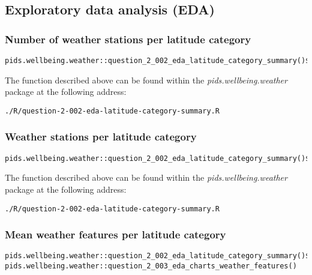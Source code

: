 \documentclass[12pt, oneside, openany]{book}
\begin{document}
\subsection*{Exploratory data analysis (EDA)}

\subsubsection*{Number of weather stations per latitude category}

\begin{verbatim}
pids.wellbeing.weather::question_2_002_eda_latitude_category_summary()$nrow
\end{verbatim}

The function described above can be found within the \emph{pids.wellbeing.weather} package at the following address:

\begin{verbatim}
./R/question-2-002-eda-latitude-category-summary.R
\end{verbatim}

\subsubsection*{Weather stations per latitude category}

\begin{verbatim}
pids.wellbeing.weather::question_2_002_eda_latitude_category_summary()$weather_stations
\end{verbatim}

The function described above can be found within the \emph{pids.wellbeing.weather} package at the following address:

\begin{verbatim}
./R/question-2-002-eda-latitude-category-summary.R
\end{verbatim}

\subsubsection*{Mean weather features per latitude category}

\begin{verbatim}
pids.wellbeing.weather::question_2_002_eda_latitude_category_summary()$means
pids.wellbeing.weather::question_2_003_eda_charts_weather_features()
\end{verbatim}
\end{document}
